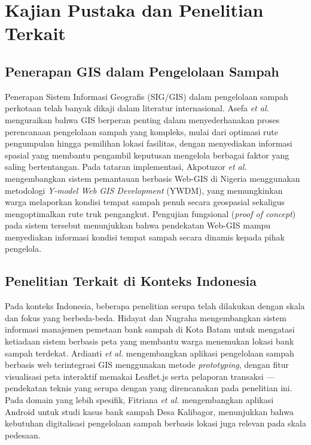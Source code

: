 \documentclass[conference]{IEEEtran}
\begin{document}
\section{Kajian Pustaka dan Penelitian Terkait}

\subsection{Penerapan GIS dalam Pengelolaan Sampah}

Penerapan Sistem Informasi Geografis (SIG/GIS) dalam pengelolaan
sampah perkotaan telah banyak dikaji dalam literatur internasional.
Asefa \textit{et al.} \cite{asefa2022} menguraikan bahwa GIS berperan
penting dalam menyederhanakan proses perencanaan pengelolaan sampah
yang kompleks, mulai dari optimasi rute pengumpulan hingga pemilihan
lokasi fasilitas, dengan menyediakan informasi spasial yang membantu
pengambil keputusan mengelola berbagai faktor yang saling bertentangan.
Pada tataran implementasi, Akpotuzor \textit{et al.} \cite{akpotuzor2020}
mengembangkan sistem pemantauan berbasis Web-GIS di Nigeria
menggunakan metodologi \textit{Y-model Web GIS Development}
(YWDM), yang memungkinkan warga melaporkan kondisi tempat sampah penuh
secara geospasial sekaligus mengoptimalkan rute truk pengangkut.
Pengujian fungsional (\textit{proof of concept}) pada sistem tersebut
menunjukkan bahwa pendekatan Web-GIS mampu menyediakan informasi
kondisi tempat sampah secara dinamis kepada pihak pengelola.

\subsection{Penelitian Terkait di Konteks Indonesia}

Pada konteks Indonesia, beberapa penelitian serupa telah dilakukan
dengan skala dan fokus yang berbeda-beda. Hidayat dan Nugraha
\cite{hidayat2023} mengembangkan sistem informasi manajemen pemetaan
bank sampah di Kota Batam untuk mengatasi ketiadaan sistem berbasis
peta yang membantu warga menemukan lokasi bank sampah terdekat.
Ardianti \textit{et al.} \cite{ardianti2025} mengembangkan aplikasi
pengelolaan sampah berbasis web terintegrasi GIS menggunakan metode
\textit{prototyping}, dengan fitur visualisasi peta interaktif
memakai Leaflet.js serta pelaporan transaksi --- pendekatan teknis
yang serupa dengan yang direncanakan pada penelitian ini. Pada domain
yang lebih spesifik, Fitriana \textit{et al.} \cite{fitriana2022}
mengembangkan aplikasi Android untuk studi kasus bank sampah Desa
Kalibagor, menunjukkan bahwa kebutuhan digitalisasi pengelolaan
sampah berbasis lokasi juga relevan pada skala pedesaan.
\end{document}
